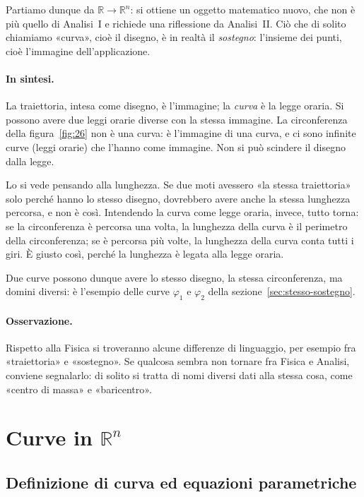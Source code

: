 Partiamo dunque da $\mathbb{R}\to\mathbb{R}^n$: si ottiene un oggetto matematico nuovo,
che non è più quello di Analisi~I e richiede una riflessione da Analisi~II.
Ciò che di solito chiamiamo «curva», cioè il disegno, è in realtà il \emph{sostegno}:
l'insieme dei punti, cioè l'immagine dell'applicazione.

\paragraph{In sintesi.} La traiettoria, intesa come disegno, è l'immagine; la
\emph{curva} è la legge oraria. Si possono avere due leggi orarie diverse con la stessa
immagine.
La circonferenza della figura~\ref{fig:26} non è una curva: è l'immagine di una curva,
e ci sono infinite curve (leggi orarie) che l'hanno come immagine.
Non si può scindere il disegno dalla legge.

Lo si vede pensando alla lunghezza. Se due moti avessero «la stessa traiettoria» solo
perché hanno lo stesso disegno, dovrebbero avere anche la stessa lunghezza percorsa, e
non è così.
Intendendo la curva come legge oraria, invece, tutto torna: se la circonferenza è
percorsa una volta, la lunghezza della curva è il perimetro della circonferenza; se è
percorsa più volte, la lunghezza della curva conta tutti i giri. È giusto così, perché
la lunghezza è legata alla legge oraria.

Due curve possono dunque avere lo stesso disegno, la stessa circonferenza, ma domini
diversi: è l'esempio delle curve $\varphi_1$ e $\varphi_2$ della
sezione~\ref{sec:stesso-sostegno}.

\paragraph{Osservazione.} Rispetto alla Fisica si troveranno alcune differenze di
linguaggio, per esempio fra «traiettoria» e «sostegno».
Se qualcosa sembra non tornare fra Fisica e Analisi, conviene segnalarlo: di solito si
tratta di nomi diversi dati alla stessa cosa, come «centro di massa» e «baricentro».

\section{Curve in $\mathbb{R}^n$}

\subsection{Definizione di curva ed equazioni parametriche}

